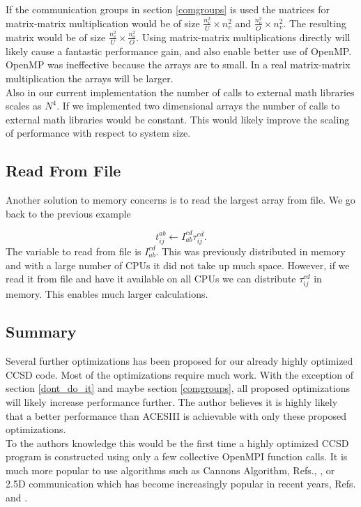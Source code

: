 \documentclass[a4paper,norsk,11pt,twoside]{report}
\begin{document}
If the communication groups in section \ref{comgroups} is used the matrices for matrix-matrix multiplication would be of size $\frac{n_v^2}{U} \times n_v^2$ and $\frac{n_o^2}{O} \times n_v^2$. The resulting matrix would be of size $\frac{n_v^2}{U} \times \frac{n_o^2}{O}$. Using matrix-matrix multiplications directly will likely cause a fantastic performance gain, and also enable better use of OpenMP. OpenMP was ineffective because the arrays are to small. In a real matrix-matrix multiplication the arrays will be larger. \\

Also in our current implementation the number of calls to external math libraries scales as $N^4$. If we implemented two dimensional arrays the number of calls to external math libraries would be constant. This would likely improve the scaling of performance with respect to system size. 

\subsection{Read From File \label{dont_do_it}}
Another solution to memory concerns is to read the largest array from file. We go back to the previous example

\begin{equation}
t_{ij}^{ab} \leftarrow I_{ab}^{cd} \tau_{ij}^{cd} .
\end{equation}
The variable to read from file is $I_{ab}^{cd}$. This was previously distributed in memory and with a large number of CPUs it did not take up much space. However, if we read it from file and have it available on all CPUs we can distribute $\tau_{ij}^{cd}$ in memory. This enables much larger calculations. 

\subsection{Summary}
Several further optimizations has been proposed for our already highly optimized CCSD code. Most of the optimizations require much work. With the exception of section \ref{dont_do_it} and maybe section \ref{comgroups}, all proposed optimizations will likely increase performance further. The author believes it is highly likely that a better performance than ACESIII is achievable with only these proposed optimizations. \\

To the authors knowledge this would be the first time a highly optimized CCSD program is constructed using only a few collective OpenMPI function calls. It is much more popular to use algorithms such as Cannons Algorithm, Refs.\cite{cannon_citation_po}, \cite{mpi_boka_cite_referanse}, or 2.5D communication which has become increasingly popular in recent years, Refs.\cite{most_effective_ccsd_dude3} and \cite{superduperartikkel}. \\
\end{document}
